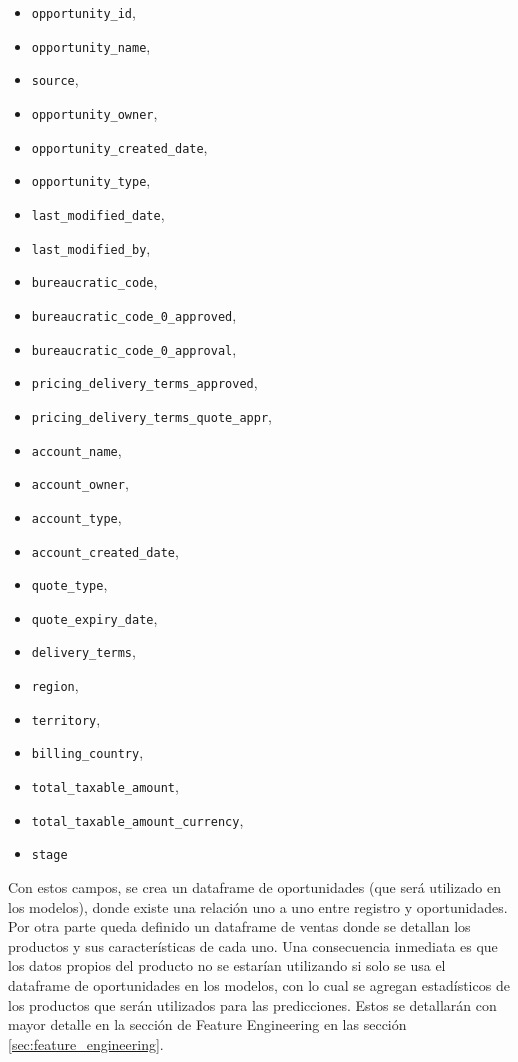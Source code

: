 \documentclass[titlepage,a4paper]{article}
\begin{document}
\begin{itemize}
    \item \verb|opportunity_id|,
    \item \verb|opportunity_name|,
    \item \verb|source|,
    \item \verb|opportunity_owner|,
    \item \verb|opportunity_created_date|,
    \item \verb|opportunity_type|,
    \item \verb|last_modified_date|,
    \item \verb|last_modified_by|,
    \item \verb|bureaucratic_code|,
    \item \verb|bureaucratic_code_0_approved|,
    \item \verb|bureaucratic_code_0_approval|,
    \item \verb|pricing_delivery_terms_approved|,
    \item \verb|pricing_delivery_terms_quote_appr|,
    \item \verb|account_name|,
    \item \verb|account_owner|,
    \item \verb|account_type|,
    \item \verb|account_created_date|,
    \item \verb|quote_type|,
    \item \verb|quote_expiry_date|,
    \item \verb|delivery_terms|,
    \item \verb|region|,
    \item \verb|territory|,
    \item \verb|billing_country|,
    \item \verb|total_taxable_amount|,
    \item \verb|total_taxable_amount_currency|,
    \item \verb|stage| 
\end{itemize}

Con estos campos, se crea un dataframe de oportunidades (que será utilizado en los modelos), donde existe una relación uno a uno entre registro y oportunidades. Por otra parte queda definido un dataframe de ventas donde se detallan los productos y sus características de cada uno. Una consecuencia inmediata es que los datos propios del producto no se estarían utilizando si solo se usa el dataframe de oportunidades en los modelos, con lo cual se agregan estadísticos de los productos que serán utilizados para las predicciones. Estos se detallarán con mayor detalle en la sección de Feature Engineering en las sección \ref{sec:feature_engineering}.
\end{document}

